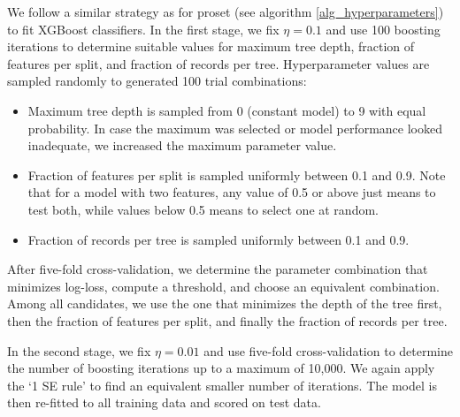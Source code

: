 %
We follow a similar strategy as for proset (see algorithm \ref{alg_hyperparameters}) to fit XGBoost classifiers.
In the first stage, we fix $\eta=0.1$ and use 100 boosting iterations to determine suitable values for maximum tree depth, fraction of features per split, and fraction of records per tree.
Hyperparameter values are sampled randomly to generated 100 trial combinations:
%
\begin{itemize}
\item Maximum tree depth is sampled from 0 (constant model) to 9 with equal probability.
In case the maximum was selected or model performance looked inadequate, we increased the maximum parameter value.
%
\item Fraction of features per split is sampled uniformly between 0.1 and 0.9.
Note that for a model with two features, any value of 0.5 or above just means to test both, while values below 0.5 means to select one at random.
%
\item Fraction of records per tree is sampled uniformly between 0.1 and 0.9.
\end{itemize}
%
After five-fold cross-validation, we determine the parameter combination that minimizes log-loss, compute a threshold, and choose an equivalent combination.
Among all candidates, we use the one that minimizes the depth of the tree first, then the fraction of features per split, and finally the fraction of records per tree.\par
%
In the second stage, we fix $\eta=0.01$ and use five-fold cross-validation to determine the number of boosting iterations up to a maximum of 10,000.
We again apply the `1 SE rule' to find an equivalent smaller number of iterations.
The model is then re-fitted to all training data and scored on test data.\par
%
